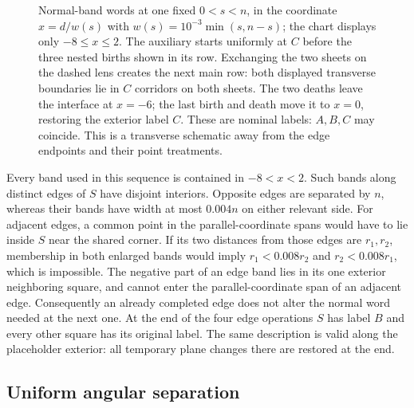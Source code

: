 \documentclass[11pt]{article}
\numberwithin{equation}{section}
\theoremstyle{definition}
\theoremstyle{remark}
\begin{document}
\begin{figure}[tbp]
\endgroup
\caption{Normal-band words at one fixed $0<s<n$, in the coordinate
  $x=d/w(s)$ with $w(s)=10^{-3}\min(s,n-s)$; the chart displays only
  $-8\le x\le2$. The auxiliary starts uniformly at $C$ before the three
  nested births shown in its row. Exchanging the two sheets on the dashed
  lens creates the next main row: both displayed transverse boundaries
  lie in $C$ corridors on both sheets. The two deaths leave the interface
  at $x=-6$; the last
  birth and death move it to $x=0$, restoring the exterior label $C$.
  These are nominal labels: $A,B,C$ may coincide. This is a transverse
  schematic away from the edge endpoints and their point treatments.}
\label{fig:geometry-bands}
\end{figure}


Every band used in this sequence is contained in $-8<x<2$.  Such
bands along distinct edges of $S$ have disjoint interiors.  Opposite
edges are separated by $n$, whereas their bands have width at most
$0.004n$ on either relevant side.  For adjacent edges, a common point
in the parallel-coordinate spans would have to lie inside $S$ near
the shared corner.  If its two distances from those edges are $r_1,r_2$,
membership in both enlarged bands would imply
$r_1<0.008r_2$ and $r_2<0.008r_1$, which is impossible.  The negative
part of an edge band lies in its one exterior neighboring square, and
cannot enter the parallel-coordinate span of an adjacent edge.
Consequently an already completed edge does not alter the normal word
needed at the next one.  At the end of the four edge operations $S$
has label $B$ and every other square has its original label.  The same
description is valid along the placeholder exterior: all temporary
plane changes there are restored at the end.

\subsection{Uniform angular separation}
\end{document}
